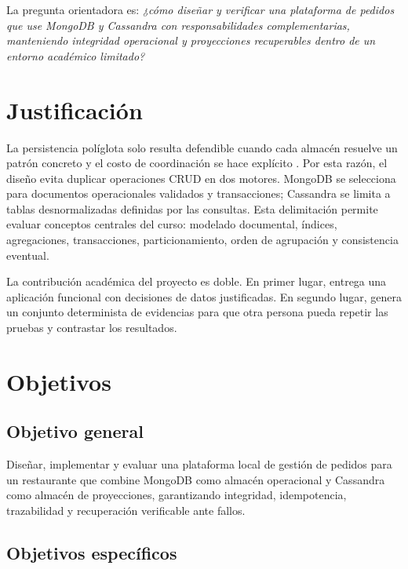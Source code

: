 La pregunta orientadora es: \emph{¿cómo diseñar y verificar una plataforma de pedidos que use MongoDB y Cassandra con responsabilidades complementarias, manteniendo integridad operacional y proyecciones recuperables dentro de un entorno académico limitado?}

\section{Justificación}

La persistencia políglota solo resulta defendible cuando cada almacén resuelve un patrón concreto y el costo de coordinación se hace explícito \parencite{sadalage2012,kleppmann2017}. Por esta razón, el diseño evita duplicar operaciones CRUD en dos motores. MongoDB se selecciona para documentos operacionales validados y transacciones; Cassandra se limita a tablas desnormalizadas definidas por las consultas. Esta delimitación permite evaluar conceptos centrales del curso: modelado documental, índices, agregaciones, transacciones, particionamiento, orden de agrupación y consistencia eventual.

La contribución académica del proyecto es doble. En primer lugar, entrega una aplicación funcional con decisiones de datos justificadas. En segundo lugar, genera un conjunto determinista de evidencias para que otra persona pueda repetir las pruebas y contrastar los resultados.

\section{Objetivos}

\subsection{Objetivo general}

Diseñar, implementar y evaluar una plataforma local de gestión de pedidos para un restaurante que combine MongoDB como almacén operacional y Cassandra como almacén de proyecciones, garantizando integridad, idempotencia, trazabilidad y recuperación verificable ante fallos.

\subsection{Objetivos específicos}

